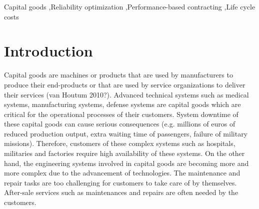 \documentclass[preprint,12pt]{elsarticle}
\begin{document}
\nocite{*}

\begin{frontmatter}
\author[label1]{Qianru Ge}
\author[label1]{Hao Peng}
\author[label1]{Geert-Jan van Houtum}



\address[label1]{Department of Industrial Engineering and Innovation Sciences, Eindhoven University of Technology, Eindhoven, The Netherlands}

\begin{abstract}
We consider an OEM who sells a series system for a customer under a Performance-Based Logistic (PBL) contract. During the design phase of the system, the OEM have to select an optimal design for each critical component in the system from all the possible alternatives with uncertain component reliability. The uncertainty  in component reliabilities can lead to large deviations of the realized system availability from the expected system availability. Upon a failure of a critical component in the system, the failed part will be replaced by a as-good-as new component. According to the PBL contract, when the total system down time exceeds a predetermined level, the OEM should pay a penalty cost to the customer with respect to the actual total downtime and a penalty rate. In this case, we formulate the Life Cycle Costs (LCC) of this multi-stage system which are affected by the uncertain component reliability. The LCC consist of design costs, repair costs and downtime costs.
\end{abstract}

\begin{keyword}
Capital goods \sep Reliability optimization  \sep Performance-based contracting \sep Life cycle costs
\end{keyword}
\end{frontmatter}

\section{Introduction}

Capital goods are machines or products that are used by manufacturers to produce their end-products or
that are used by service organizations to deliver their services (van Houtum 2010?). Advanced technical systems such as medical systems, manufacturing systems, defense systems are capital goods which are critical for the operational processes of their customers. System downtime of these capital goods can cause serious consequences (e.g. millions of euros of reduced production output, extra waiting time of passengers, failure of military missions). Therefore, customers of these complex systems such as hospitals, militaries and factories require high availability of these systems. On the other hand, the engineering systems involved in capital goods are becoming more and more complex due to the advancement of technologies. The maintenance and repair tasks are too challenging for customers to take care of by themselves. After-sale services such as maintenances and repairs are often needed by the customers.
\end{document}
